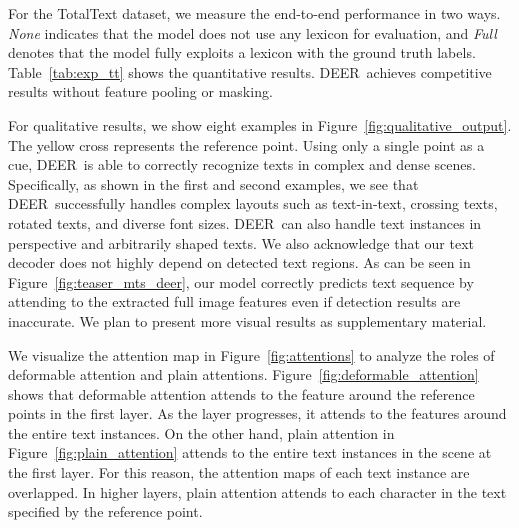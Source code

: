 \documentclass[10pt,twocolumn,letterpaper]{article}
\newcommand{\Figure}[1]{Figure~\ref{fig:#1}}
\newcommand{\Table}[1]{Table~\ref{tab:#1}}
\newcommand{\methodname}[0]{DEER}
\begin{document}
For the TotalText dataset, we measure the end-to-end performance in two ways. \textit{None} indicates that the model does not use any lexicon for evaluation, and \textit{Full} denotes that the model fully exploits a lexicon with the ground truth labels. \Table{exp_tt} shows the quantitative results. \methodname~achieves competitive results without feature pooling or masking. 



For qualitative results, we show eight examples in \Figure{qualitative_output}. The yellow cross represents the reference point.
Using only a single point as a cue, \methodname~is able to correctly recognize texts in complex and dense scenes. Specifically, as shown in the first and second examples, we see that \methodname~successfully handles complex layouts such as text-in-text, crossing texts, rotated texts, and diverse font sizes.
\methodname~can also handle text instances in perspective and arbitrarily shaped texts. 
We also acknowledge that our text decoder does not highly depend on detected text regions. As can be seen in \Figure{teaser_mts_deer}, our model correctly predicts text sequence by attending to the extracted full image features even if detection results are inaccurate. We plan to present more visual results as supplementary material.



We visualize the attention map in \Figure{attentions} to analyze the roles of deformable attention and plain attentions. 
\Figure{deformable_attention} shows that deformable attention attends to the feature around the reference points in the first layer. As the layer progresses, it attends to the features around the entire text instances.
On the other hand, plain attention in \Figure{plain_attention} attends to the entire text instances in the scene at the first layer. For this reason,  the attention maps of each text instance are overlapped. In higher layers, plain attention attends to each character in the text specified by the reference point.
\end{document}
